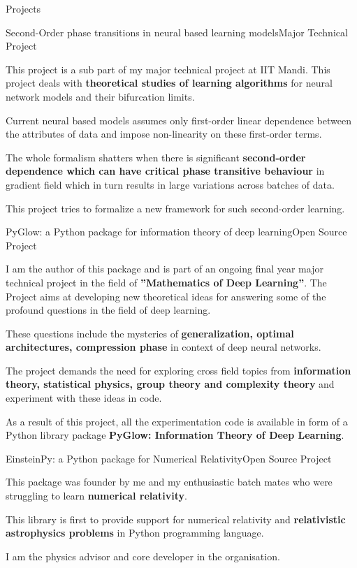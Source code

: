 \documentclass{resume} %
\begin{document}
\begin{rSection}{Projects}

\begin{rSubsection}{Second-Order phase transitions in neural based learning models}{Major Technical Project}{}{}
    \item This project is a sub part of my major technical project at IIT Mandi. This project deals with \textbf{theoretical studies of learning algorithms} for neural network models and their bifurcation limits.
    \item Current neural based models assumes only first-order linear dependence between the attributes of data and impose non-linearity on these first-order terms.
    \item The whole formalism shatters when there is significant \textbf{second-order dependence which can have critical phase transitive behaviour} in gradient field which in turn results in large variations across batches of data.
    \item This project tries to formalize a new framework for such second-order learning.
\end{rSubsection}

\begin{rSubsection}{PyGlow: a Python package for information theory of deep learning}{Open Source Project}{}{}
\item I am the author of this package and is part of an ongoing final year major technical project in the field of \textbf{”Mathematics of Deep Learning”}. The Project aims at developing new theoretical ideas for answering some of the profound questions in the field of deep learning.
    \item These questions include the mysteries of \textbf{generalization, optimal architectures, compression phase} in context of deep neural networks.
    \item The project demands the need for exploring cross field topics from \textbf{information theory, statistical physics, group theory and complexity theory} and experiment with these ideas in code.
    \item As a result of this project, all the experimentation code is available in form of a Python library package \textbf{PyGlow: Information Theory of Deep Learning}.
\end{rSubsection}

\begin{rSubsection}{EinsteinPy: a Python package for Numerical Relativity}{Open Source Project}{}{}
\item This package was founder by me and my enthusiastic batch mates who were struggling to learn \textbf{numerical relativity}.
\item This library is first to provide support for numerical relativity and \textbf{relativistic astrophysics problems} in Python programming language.
\item I am the physics advisor and core developer in the organisation.


\end{rSubsection}
\end{rSection}
\end{document}
